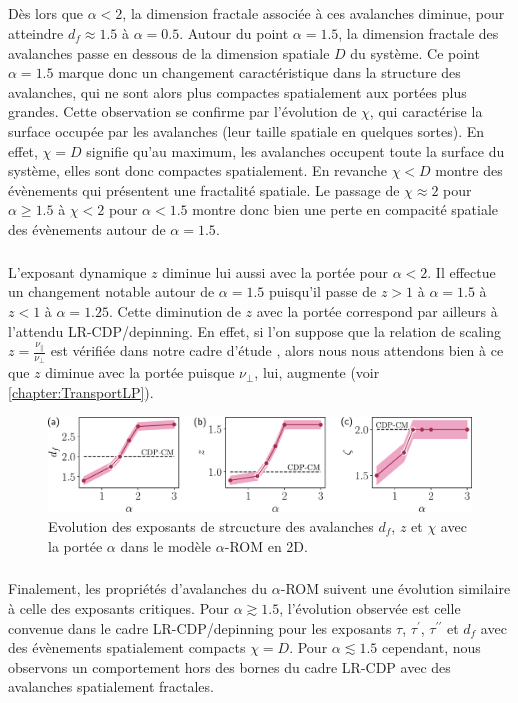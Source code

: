 \subparagraph{}Dès lors que $\alpha < 2$, la dimension fractale associée à ces avalanches diminue, pour atteindre $d_f \approx 1.5$ à $\alpha = 0.5$. Autour du point $\alpha = 1.5$, la dimension fractale des avalanches passe en dessous de la dimension spatiale $D$ du système. Ce point $\alpha = 1.5$ marque donc un changement caractéristique dans la structure des avalanches, qui ne sont alors plus compactes spatialement aux portées plus grandes. Cette observation se confirme par l'évolution de $\chi$, qui caractérise la surface occupée par les avalanches (leur taille spatiale en quelques sortes). En effet, $\chi = D$ signifie qu'au maximum, les avalanches occupent toute la surface du système, elles sont donc compactes spatialement. En revanche $\chi < D$ montre des évènements qui présentent une fractalité spatiale. Le passage de $\chi\approx 2$ pour $\alpha\geq 1.5$ à $\chi < 2$ pour $\alpha < 1.5$ montre donc bien une perte en compacité spatiale des évènements autour de $\alpha = 1.5$.

\subparagraph{}L'exposant dynamique $z$ diminue lui aussi avec la portée pour $\alpha<2$. Il effectue un changement notable autour de $\alpha = 1.5$ puisqu'il passe de $z>1$ à $\alpha=1.5$ à $z<1$ à $\alpha=1.25$. Cette diminution de $z$ avec la portée correspond par ailleurs à l'attendu LR-CDP/depinning. En effet, si l'on suppose que la relation de scaling $z = \frac{\nu_\parallel}{\nu_\perp}$ est vérifiée dans notre cadre d'étude \cite{lubeck_universal_2004}, alors nous nous attendons bien à ce que $z$ diminue avec la portée puisque $\nu_\perp$, lui, augmente (voir \autoref{chapter:TransportLP}).

\begin{figure}[h]
	\centering
	\includegraphics[width=\textwidth]{Chapitre3/Figures/Avalanches/Recap_AvSuspensions.pdf}
	\caption{Evolution des exposants de strcucture des avalanches $d_f$, $z$ et $\chi$ avec la portée $\alpha$ dans le modèle $\alpha$-ROM en 2D.}
	\label{fig:EvolAvSusp}
\end{figure}

\subparagraph{}Finalement, les propriétés d'avalanches du $\alpha$-ROM suivent une évolution similaire à celle des exposants critiques. Pour $\alpha \gtrsim 1.5$, l'évolution observée est celle convenue dans le cadre LR-CDP/depinning pour les exposants $\tau$, $\tau^\prime$, $\tau^{\prime\prime}$ et $d_f$ avec des évènements spatialement compacts $\chi=D$. Pour $\alpha\lesssim 1.5$ cependant, nous observons un comportement hors des bornes du cadre LR-CDP avec des avalanches spatialement fractales.

